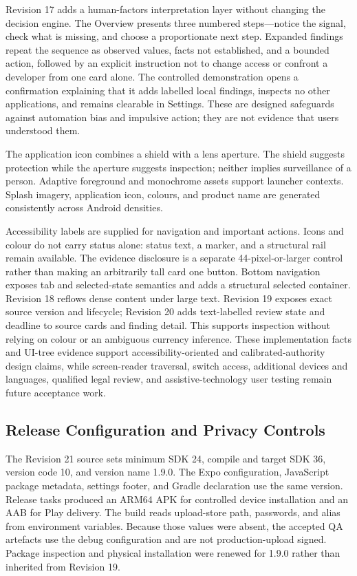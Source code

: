 Revision 17 adds a human-factors interpretation layer without changing the decision engine. The Overview presents three numbered steps---notice the signal, check what is missing, and choose a proportionate next step. Expanded findings repeat the sequence as observed values, facts not established, and a bounded action, followed by an explicit instruction not to change access or confront a developer from one card alone. The controlled demonstration opens a confirmation explaining that it adds labelled local findings, inspects no other applications, and remains clearable in Settings. These are designed safeguards against automation bias and impulsive action; they are not evidence that users understood them.

The application icon combines a shield with a lens aperture. The shield suggests protection while the aperture suggests inspection; neither implies surveillance of a person. Adaptive foreground and monochrome assets support launcher contexts. Splash imagery, application icon, colours, and product name are generated consistently across Android densities.

Accessibility labels are supplied for navigation and important actions. Icons and colour do not carry status alone: status text, a marker, and a structural rail remain available. The evidence disclosure is a separate 44-pixel-or-larger control rather than making an arbitrarily tall card one button. Bottom navigation exposes tab and selected-state semantics and adds a structural selected container. Revision 18 reflows dense content under large text. Revision 19 exposes exact source version and lifecycle; Revision 20 adds text-labelled review state and deadline to source cards and finding detail. This supports inspection without relying on colour or an ambiguous currency inference. These implementation facts and UI-tree evidence support accessibility-oriented and calibrated-authority design claims, while screen-reader traversal, switch access, additional devices and languages, qualified legal review, and assistive-technology user testing remain future acceptance work.

\subsection{Release Configuration and Privacy Controls}

The Revision 21 source sets minimum SDK 24, compile and target SDK 36, version code 10, and version name 1.9.0. The Expo configuration, JavaScript package metadata, settings footer, and Gradle declaration use the same version. Release tasks produced an ARM64 APK for controlled device installation and an AAB for Play delivery. The build reads upload-store path, passwords, and alias from environment variables. Because those values were absent, the accepted QA artefacts use the debug configuration and are not production-upload signed. Package inspection and physical installation were renewed for 1.9.0 rather than inherited from Revision 19.

